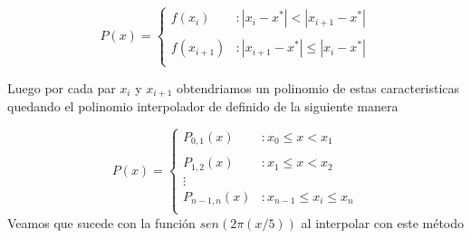 \vspace{4mm}
\begin{displaymath}
   P(x) = \left\{
     \begin{array}{lr}
       f(x_i)  & : |x_i - x^*| < |x_{i+1} - x^*|\\\\
       f(x_{i+1})  & : |x_{i+1} - x^*| \leq |x_i - x^*|\\
     \end{array}
   \right.
\end{displaymath} 

Luego por cada par $x_i$ y $x_{i+1}$ obtendriamos un polinomio de estas caracteristicas quedando el polinomio interpolador de definido de la siguiente manera

\vspace{4mm}
\begin{displaymath}
   P(x) = \left\{
     \begin{array}{lr}
       P_{0,1}(x)  & : x_0 \leq x < x_1\\\\
       P_{1,2}(x)  & : x_1 \leq x < x_2\\
       \vdots\\
       P_{n-1,n}(x) & : x_{n-1} \leq x_i \leq x_n\\
     \end{array}
   \right.
\end{displaymath} 
\vspace{4mm}
Veamos que sucede con la función $sen(2\pi(x/5))$ al interpolar con este método

